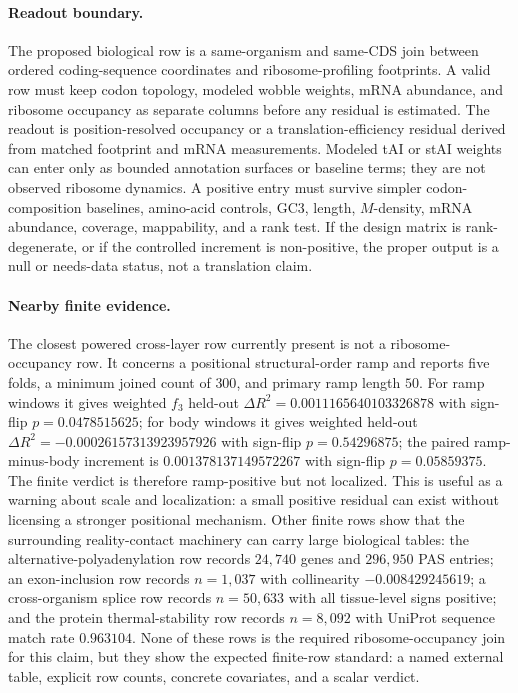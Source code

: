 \paragraph{Readout boundary.}
The proposed biological row is a same-organism and same-CDS join between ordered coding-sequence coordinates and ribosome-profiling footprints. A valid row must keep codon topology, modeled wobble weights, mRNA abundance, and ribosome occupancy as separate columns before any residual is estimated. The readout is position-resolved occupancy or a translation-efficiency residual derived from matched footprint and mRNA measurements. Modeled tAI or stAI weights can enter only as bounded annotation surfaces or baseline terms; they are not observed ribosome dynamics. A positive entry must survive simpler codon-composition baselines, amino-acid controls, GC3, length, $M$-density, mRNA abundance, coverage, mappability, and a rank test. If the design matrix is rank-degenerate, or if the controlled increment is non-positive, the proper output is a null or needs-data status, not a translation claim.

\paragraph{Nearby finite evidence.}
The closest powered cross-layer row currently present is not a ribosome-occupancy row. It concerns a positional structural-order ramp and reports five folds, a minimum joined count of $300$, and primary ramp length $50$. For ramp windows it gives weighted $f_3$ held-out $\Delta R^2=0.0011165640103326878$ with sign-flip $p=0.0478515625$; for body windows it gives weighted held-out $\Delta R^2=-0.00026157313923957926$ with sign-flip $p=0.54296875$; the paired ramp-minus-body increment is $0.001378137149572267$ with sign-flip $p=0.05859375$. The finite verdict is therefore ramp-positive but not localized. This is useful as a warning about scale and localization: a small positive residual can exist without licensing a stronger positional mechanism. Other finite rows show that the surrounding reality-contact machinery can carry large biological tables: the alternative-polyadenylation row records $24{,}740$ genes and $296{,}950$ PAS entries; an exon-inclusion row records $n=1{,}037$ with collinearity $-0.008429245619$; a cross-organism splice row records $n=50{,}633$ with all tissue-level signs positive; and the protein thermal-stability row records $n=8{,}092$ with UniProt sequence match rate $0.963104$. None of these rows is the required ribosome-occupancy join for this claim, but they show the expected finite-row standard: a named external table, explicit row counts, concrete covariates, and a scalar verdict.

